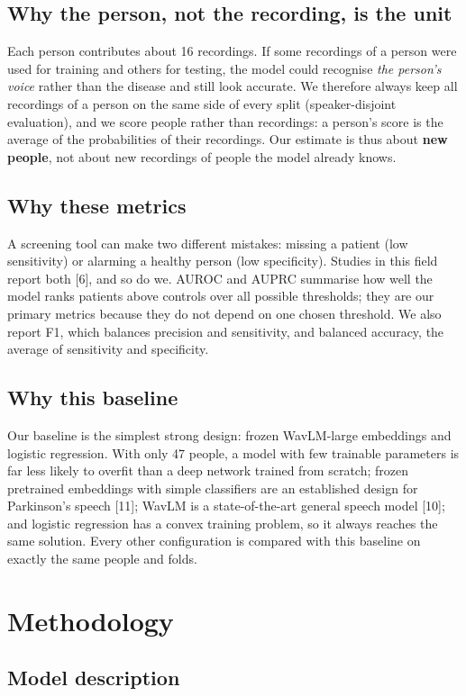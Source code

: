 \documentclass[11pt,a4paper]{article}
\begin{document}
\subsection{Why the person, not the recording, is the unit}
Each person contributes about 16 recordings. If some recordings of a person were used for training and others for testing, the model could recognise \emph{the person's voice} rather than the disease and still look accurate. We therefore always keep all recordings of a person on the same side of every split (speaker-disjoint evaluation), and we score people rather than recordings: a person's score is the average of the probabilities of their recordings. Our estimate is thus about \textbf{new people}, not about new recordings of people the model already knows.

\subsection{Why these metrics}
A screening tool can make two different mistakes: missing a patient (low sensitivity) or alarming a healthy person (low specificity). Studies in this field report both [6], and so do we. AUROC and AUPRC summarise how well the model ranks patients above controls over all possible thresholds; they are our primary metrics because they do not depend on one chosen threshold. We also report F1, which balances precision and sensitivity, and balanced accuracy, the average of sensitivity and specificity.

\subsection{Why this baseline}
Our baseline is the simplest strong design: frozen WavLM-large embeddings and logistic regression. With only 47 people, a model with few trainable parameters is far less likely to overfit than a deep network trained from scratch; frozen pretrained embeddings with simple classifiers are an established design for Parkinson's speech [11]; WavLM is a state-of-the-art general speech model [10]; and logistic regression has a convex training problem, so it always reaches the same solution. Every other configuration is compared with this baseline on exactly the same people and folds.

\section{Methodology}\label{sec:method}
\subsection{Model description}\label{sec:model}
\end{document}
